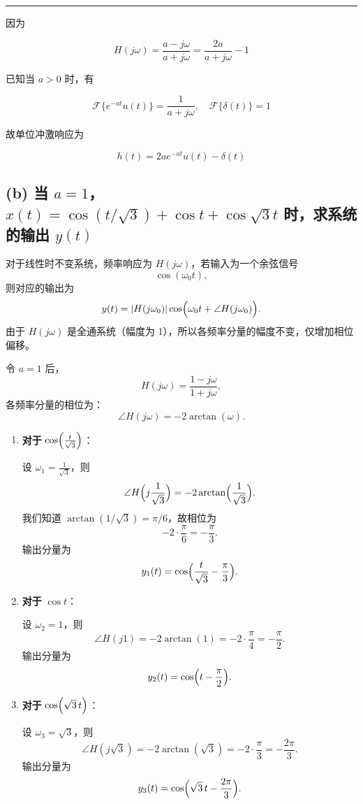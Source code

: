 \documentclass[11pt]{article}
\begin{document}
\begin{center}\rule{0.5\linewidth}{0.5pt}\end{center}

因为

\[
H(j\omega) = \frac{a - j\omega}{a + j\omega} = \frac{2a}{a+j\omega} - 1
\]

已知当 \(a > 0\) 时，有

\[
\mathcal{F}\{e^{-at}u(t)\} = \frac{1}{a + j\omega}, \quad \mathcal{F}\{\delta(t)\} =1
\]

故单位冲激响应为

\[\boxed{
h(t) = 2ae^{-at}u(t) - \delta(t)}
\]

\subsection{\texorpdfstring{(b) 当
\(a=1\)，\(x(t) = \cos(t/\sqrt 3) + \cos t + \cos \sqrt 3 t\)
时，求系统的输出
\(y(t)\)}{(b) 当 a=1，x(t) = \textbackslash cos(t/\textbackslash sqrt 3) + \textbackslash cos t + \textbackslash cos \textbackslash sqrt 3 t 时，求系统的输出 y(t)}}\label{b-ux5f53-a1xt-costsqrt-3-cos-t-cos-sqrt-3-t-ux65f6ux6c42ux7cfbux7edfux7684ux8f93ux51fa-yt}

对于线性时不变系统，频率响应为 \(H(j\omega)\)，若输入为一个余弦信号 \[
\cos(\omega_0t),
\] 则对应的输出为 \[
y(t)= |H(j\omega_0)|\cos\Bigl(\omega_0 t + \angle H(j\omega_0)\Bigr).
\] 由于 \(H(j\omega)\) 是全通系统（幅度为
1），所以各频率分量的幅度不变，仅增加相位偏移。

令 \(a=1\) 后， \[
H(j\omega)= \frac{1-j\omega}{1+j\omega},
\] 各频率分量的相位为： \[
\angle H(j\omega)= -2\arctan(\omega).
\]

\begin{enumerate}
\def\labelenumi{\arabic{enumi}.}
\item
  \textbf{对于} \(\cos\Bigl(\frac{t}{\sqrt3}\Bigr)\)：

  设 \(\omega_1=\frac{1}{\sqrt3}\)，则 \[
  \angle H\Bigl(j\frac{1}{\sqrt3}\Bigr) = -2\arctan\Bigl(\frac{1}{\sqrt3}\Bigr).
  \] 我们知道 \(\arctan(1/\sqrt3)=\pi/6\)，故相位为 \[
  -2\cdot\frac{\pi}{6} = -\frac{\pi}{3}.
  \] 输出分量为 \[
  y_1(t)= \cos\Bigl(\frac{t}{\sqrt3} - \frac{\pi}{3}\Bigr).
  \]
\item
  \textbf{对于} \(\cos t\)：

  设 \(\omega_2=1\)，则 \[
  \angle H(j1)= -2\arctan(1)= -2\cdot \frac{\pi}{4} = -\frac{\pi}{2}.
  \] 输出分量为 \[
  y_2(t)= \cos\Bigl(t - \frac{\pi}{2}\Bigr).
  \]
\item
  \textbf{对于} \(\cos\Bigl(\sqrt3\,t\Bigr)\)：

  设 \(\omega_3=\sqrt3\)，则 \[
  \angle H(j\sqrt3)= -2\arctan(\sqrt3) = -2\cdot \frac{\pi}{3} = -\frac{2\pi}{3}.
  \] 输出分量为 \[
  y_3(t)= \cos\Bigl(\sqrt3\,t - \frac{2\pi}{3}\Bigr).
  \]
\end{enumerate}
\end{document}
